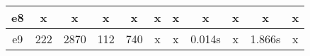 \begin{table}[]
\begin{tabular}{@{}|c|c|c|c|c|c|c|c|c|c|c|@{}}
e8    & x                  & x                  & x                     & x                     & x                    & x                     & x        & x       & x                & x              \\ \midrule
e9    & 222                & 2870               & 112                   & 740                   & x                    & x                     & 0.014s   & x       & 1.866s           & x              \\ \bottomrule
\end{tabular}
\end{table}
